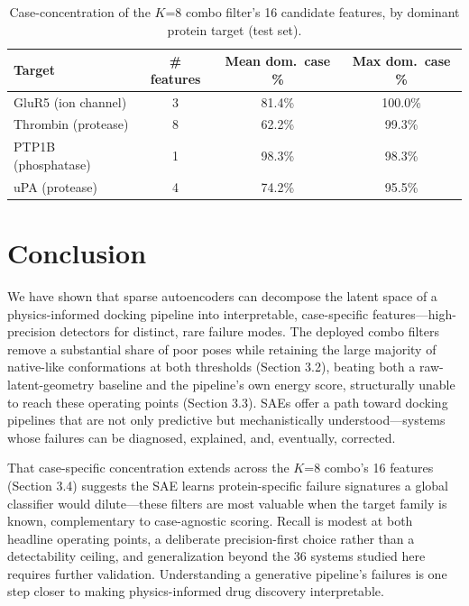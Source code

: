 \documentclass{article}
\begin{document}
\begin{table}[!ht]
\caption{\small Case-concentration of the $K$=8 combo filter's 16 candidate features, by dominant protein target (test set).}
\label{tab:case_concentration}
\centering
\begin{small}
\setlength{\tabcolsep}{5pt}
\begin{tabular}{lccc}
\toprule
Target & \# features & Mean dom.\ case \% & Max dom.\ case \% \\
\midrule
GluR5 (ion channel)  & 3 & 81.4\% & 100.0\% \\
Thrombin (protease)  & 8 & 62.2\% & 99.3\%  \\
PTP1B (phosphatase)  & 1 & 98.3\% & 98.3\%  \\
uPA (protease)       & 4 & 74.2\% & 95.5\%  \\
\bottomrule
\end{tabular}
\end{small}
\end{table}

\section{Conclusion}

We have shown that sparse autoencoders can decompose the latent space of a physics-informed docking pipeline into interpretable, case-specific features---high-precision detectors for distinct, rare failure modes. The deployed combo filters remove a substantial share of poor poses while retaining the large majority of native-like conformations at both thresholds (Section 3.2), beating both a raw-latent-geometry baseline and the pipeline's own energy score, structurally unable to reach these operating points (Section 3.3). SAEs offer a path toward docking pipelines that are not only predictive but mechanistically understood---systems whose failures can be diagnosed, explained, and, eventually, corrected.

That case-specific concentration extends across the $K$=8 combo's 16 features (Section 3.4) suggests the SAE learns protein-specific failure signatures a global classifier would dilute---these filters are most valuable when the target family is known, complementary to case-agnostic scoring. Recall is modest at both headline operating points, a deliberate precision-first choice rather than a detectability ceiling, and generalization beyond the 36 systems studied here requires further validation. Understanding a generative pipeline's failures is one step closer to making physics-informed drug discovery interpretable.
\end{document}
